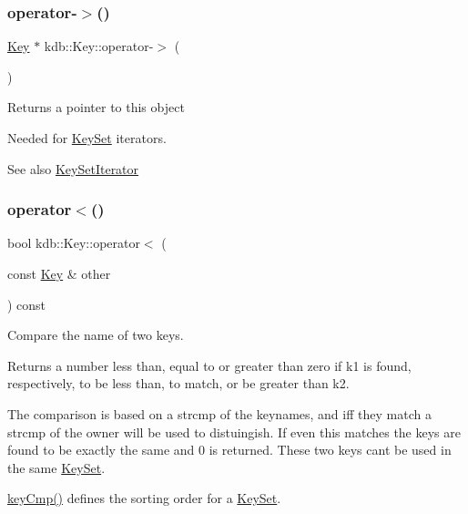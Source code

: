 \subsubsection{\texorpdfstring{operator-\/$>$()}{operator->()}}
{\footnotesize\ttfamily \mbox{\hyperlink{classkdb_1_1Key}{Key}} $\ast$ kdb\+::\+Key\+::operator-\/$>$ (\begin{DoxyParamCaption}{ }\end{DoxyParamCaption})\hspace{0.3cm}{\ttfamily [inline]}}

\begin{DoxyReturn}{Returns}
a pointer to this object
\end{DoxyReturn}
Needed for \mbox{\hyperlink{classkdb_1_1KeySet}{Key\+Set}} iterators. \begin{DoxySeeAlso}{See also}
\mbox{\hyperlink{classkdb_1_1KeySetIterator}{Key\+Set\+Iterator}} 
\end{DoxySeeAlso}
\mbox{\label{classkdb_1_1Key_aae9d359b54dc0df7d7b3ab3755a09732}} 
\subsubsection{\texorpdfstring{operator$<$()}{operator<()}}
{\footnotesize\ttfamily bool kdb\+::\+Key\+::operator$<$ (\begin{DoxyParamCaption}\item[{const \mbox{\hyperlink{classkdb_1_1Key}{Key}} \&}]{other }\end{DoxyParamCaption}) const\hspace{0.3cm}{\ttfamily [inline]}}



Compare the name of two keys. 

\begin{DoxyReturn}{Returns}
a number less than, equal to or greater than zero if k1 is found, respectively, to be less than, to match, or be greater than k2.
\end{DoxyReturn}
The comparison is based on a strcmp of the keynames, and iff they match a strcmp of the owner will be used to distuingish. If even this matches the keys are found to be exactly the same and 0 is returned. These two keys can\textquotesingle{}t be used in the same \mbox{\hyperlink{classkdb_1_1KeySet}{Key\+Set}}.

\mbox{\hyperlink{group__keytest_gaf6e66e12fe04d535a5d1c8218ced803e}{key\+Cmp()}} defines the sorting order for a \mbox{\hyperlink{classkdb_1_1KeySet}{Key\+Set}}.

